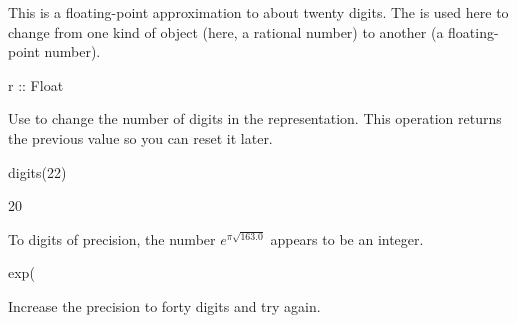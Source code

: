 {{{{{{{{\begin{xtc}
\begin{xtccomment}
This is a floating-point approximation to about twenty digits.
The \spadSyntax{::}
is used here to change from one kind of object
(here, a rational number) to another (a floating-point number).
\end{xtccomment}
\begin{spadsrc}
r :: Float 
\end{spadsrc}
\begin{TeXOutput}
\begin{fricasmath}{10}
%
\end{fricasmath}
\end{TeXOutput}
\end{xtc}
\begin{xtc}
\begin{xtccomment}
Use  to change the number of digits in
the representation.
This operation returns the previous value so you can reset it
later.
\end{xtccomment}
\begin{spadsrc}
digits(22) 
\end{spadsrc}
\begin{TeXOutput}
\begin{fricasmath}{11}
20%
\end{fricasmath}
\end{TeXOutput}
\end{xtc}
\begin{xtc}
\begin{xtccomment}
To  digits of precision, the number
$e^{\pi {\sqrt {163.0}}}$
appears to be an integer.
\end{xtccomment}
\begin{spadsrc}
exp(%
\end{spadsrc}
\begin{TeXOutput}
\begin{fricasmath}{12}
%
\end{fricasmath}
\end{TeXOutput}
\end{xtc}
\begin{xtc}
\begin{xtccomment}
Increase the precision to forty digits and try again.
\end{xtccomment}
\begin{spadsrc}

\end{spadsrc}
\end{xtc}}}}}}}}}
